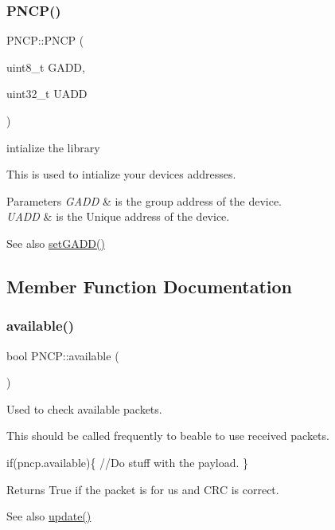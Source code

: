 \subsubsection{\texorpdfstring{P\+N\+C\+P()}{PNCP()}}
{\footnotesize\ttfamily P\+N\+C\+P\+::\+P\+N\+CP (\begin{DoxyParamCaption}\item[{uint8\+\_\+t}]{G\+A\+DD,  }\item[{uint32\+\_\+t}]{U\+A\+DD }\end{DoxyParamCaption})}



intialize the library 

This is used to intialize your devices addresses.


\begin{DoxyParams}{Parameters}
{\em G\+A\+DD} & is the group address of the device. \\
\hline
{\em U\+A\+DD} & is the Unique address of the device. \\
\hline
\end{DoxyParams}
\begin{DoxySeeAlso}{See also}
\hyperlink{class_p_n_c_p_a14efa4c46289d86be1a49f8e5594f396}{set\+G\+A\+D\+D()} 
\end{DoxySeeAlso}


\subsection{Member Function Documentation}
\mbox{\label{class_p_n_c_p_a153136448f88a3d2ac580c329620aea4}} 
\subsubsection{\texorpdfstring{available()}{available()}}
{\footnotesize\ttfamily bool P\+N\+C\+P\+::available (\begin{DoxyParamCaption}{ }\end{DoxyParamCaption})}



Used to check available packets. 

This should be called frequently to beable to use received packets. 
\begin{DoxyCode}
  \textcolor{keywordflow}{if}(pncp.available)\{
  \textcolor{comment}{//Do stuff with the payload.}
\}
\end{DoxyCode}
 \begin{DoxyReturn}{Returns}
True if the packet is for us and C\+RC is correct. 
\end{DoxyReturn}
\begin{DoxySeeAlso}{See also}
\hyperlink{class_p_n_c_p_ab292e3b595289320a03ed6179750942d}{update()} 
\end{DoxySeeAlso}
\mbox{\label{class_p_n_c_p_ae37424d9ee5f2232e0fc1f3d9e81f0ad}} 
